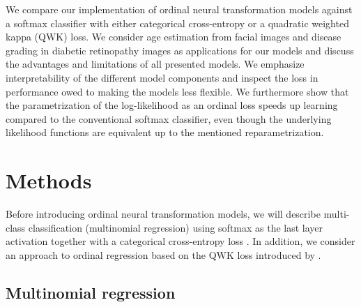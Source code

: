\documentclass[article,nojss,shortnames]{jss}\usepackage[]{graphicx}\usepackage[]{color}
\begin{document}
We compare our implementation of ordinal neural transformation models against
a softmax classifier with either categorical cross-entropy or a quadratic weighted
kappa (QWK) loss.
We consider age estimation from facial images and disease grading in diabetic
retinopathy images as applications for our models and discuss the advantages and
limitations of all presented models.
We emphasize interpretability of the different model components and inspect the
loss in performance owed to making the models less flexible.
We furthermore show that the parametrization of the log-likelihood as an ordinal
loss speeds up learning compared to the conventional softmax classifier, even
though the underlying likelihood functions are equivalent up to the mentioned
reparametrization.

\section{Methods} \label{sec:methods}

Before introducing ordinal neural transformation models, we will describe
multi-class classification (multinomial regression) using softmax as the last
layer activation together with a categorical cross-entropy loss \citep{goodfellow2016deep}.
In addition, we consider an approach to ordinal regression based on the QWK loss
introduced by \citet{de2018weighted}.

\subsection{Multinomial regression} \label{sec:softmax}
\end{document}
